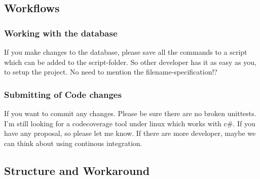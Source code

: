\documentclass{article}
\begin{document}
\subsection{Workflows}
\subsubsection{Working with the database}
If you make changes to the database, please save all the commands to a script
which can be added to the script-folder. So other developer has it as easy as
you, to setup the project. No need to mention the filename-specification!?
\subsubsection{Submitting of Code changes}
If you want to commit any changes. Please be sure there are no broken unittests.
I'm still looking for a codecoverage tool under linux which works with c\#. If
you have any proposal, so please let me know. If there are more developer, maybe
we can think about using continous integration.

\subsection{Structure and Workaround}
\end{document}
